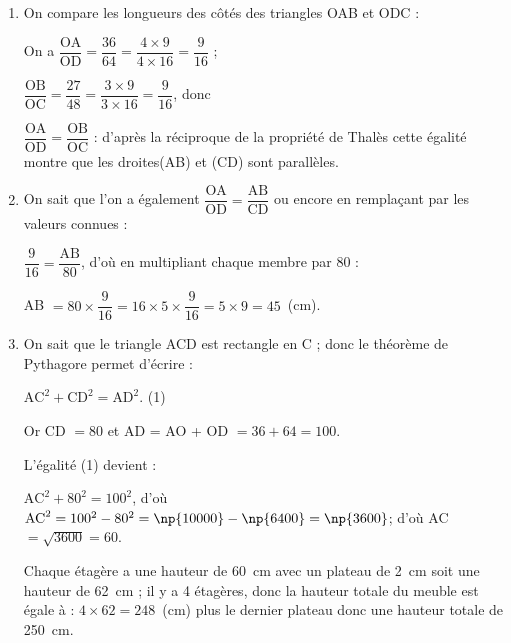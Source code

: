\documentclass[10pt]{article}
\begin{document}
\begin{enumerate}
\item On compare les longueurs des côtés des triangles OAB et ODC :

On a $\dfrac{\text{OA}}{\text{OD}} = \dfrac{36}{64} = \dfrac{4 \times 9}{4 \times 16} = \dfrac{9}{16}$ ;

$\dfrac{\text{OB}}{\text{OC}} = \dfrac{27}{48} = \dfrac{3 \times 9}{3 \times 16} = \dfrac{9}{16}$, donc 

$\dfrac{\text{OA}}{\text{OD}} = \dfrac{\text{OB}}{\text{OC}}$ : d'après la réciproque de la propriété de Thalès cette égalité montre que les droites(AB) et (CD) sont parallèles.
\item On sait que l'on a également $\dfrac{\text{OA}}{\text{OD}} =\dfrac{\text{AB}}{\text{CD}}$ ou encore en remplaçant par les valeurs connues :

$\dfrac{9}{16} = \dfrac{\text{AB}}{80}$, d'où en multipliant chaque membre par 80 : 

AB $ = 80 \times \dfrac{9}{16} = 16 \times 5 \times \dfrac{9}{16} = 5 \times 9 = 45$~(cm).
\item On sait que le triangle ACD est rectangle en C ; donc le théorème de Pythagore permet d'écrire :

$\text{AC}^2 + \text{CD}^2 = \text{AD}^2$. \quad (1)

Or CD $ = 80$ et AD = AO + OD $= 36 + 64 = 100$.

L'égalité (1) devient :

$\text{AC}^2 + 80^2 = 100^2$, d'où $\text{AC}^2 = 100^2 - 80^2 = \np{10000} - \np{6400} = \np{3600}$; d'où AC $ = \sqrt{3600} = 60$.

Chaque étagère a une hauteur de 60~cm avec un plateau de 2~cm soit une hauteur de 62~cm ; il y a 4 étagères, donc la hauteur totale du meuble est égale à : $4 \times 62 = 248$~(cm) plus le dernier plateau donc une hauteur totale de 250~cm.
\end{enumerate}

\vspace{0,5cm}
\end{document}
